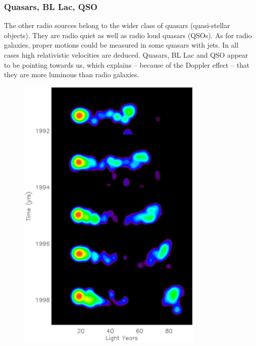 \documentclass[10pt,a4paper,english]{article}
\begin{document}
\subsubsection{Quasars, BL Lac, QSO}

The other radio sources belong to the wider class of quasars (quasi-stellar
objects). They are radio quiet as well as radio loud quasars (QSOs). As for
radio galaxies, proper motions could be measured in some quasars with jets. In
all cases high relativistic velocities are deduced. Quasars, BL Lac and QSO
appear to be pointing towards us, which explains – because of the Doppler
effect – that they are more luminous than radio galaxies.

\begin{figure}[!ht]
    \noindent
    \begin{minipage}{.6\textwidth}
        \centering
        \includegraphics[width=0.8\textwidth]{3c279_mosaic_hi.jpg}
    \end{minipage}%
    \hfill
    \begin{minipage}{.4\textwidth}
        \caption{
}
\end{minipage}
\end{figure}
\end{document}
